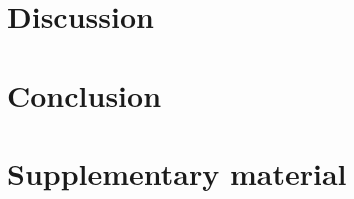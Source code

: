 \documentclass{report}
\begin{document}
% 

\chapter{Discussion}


\chapter{Conclusion}


\newpage
\singlespacing



\newpage
\doublespacing
\appendix
\chapter{Supplementary material}

\end{document}
